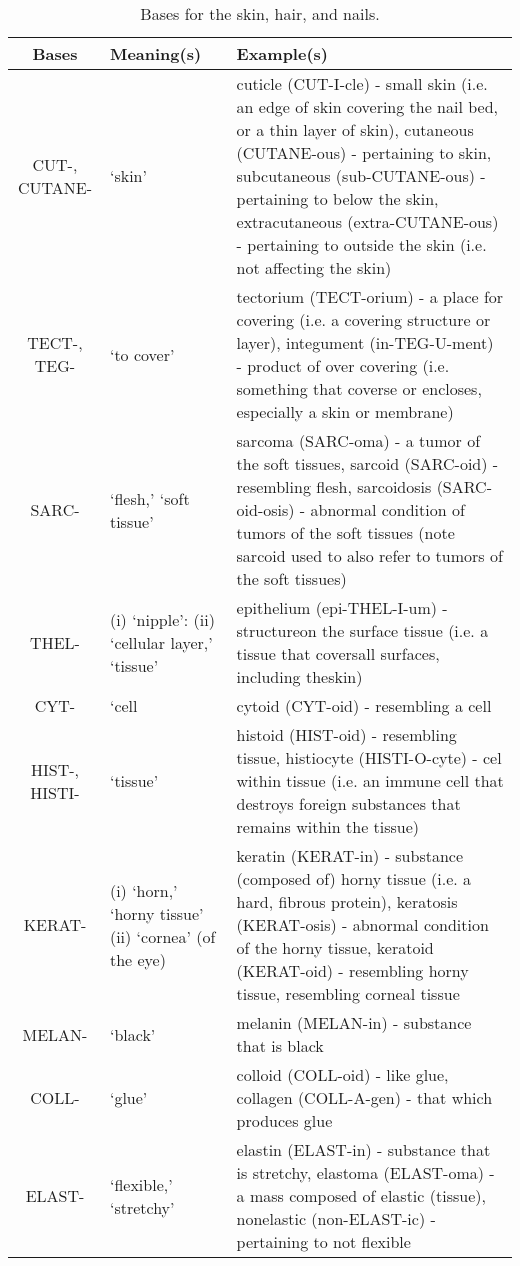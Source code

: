 \begin{longtable}{c | p{} | p{}}
    \caption{Bases for the skin, hair, and nails.}
    \hline
    Bases & Meaning(s) & Example(s) \\ \hline
        CUT-, CUTANE- & `skin' & cuticle (CUT-I-cle) - small skin (i.e. an edge of skin covering the nail bed, or a thin layer of skin), cutaneous (CUTANE-ous) - pertaining to skin, subcutaneous (sub-CUTANE-ous) - pertaining to below the skin, extracutaneous (extra-CUTANE-ous) - pertaining to outside the skin (i.e. not affecting the skin) \\
        TECT-, TEG- & `to cover' & tectorium (TECT-orium) - a place for covering (i.e. a covering structure or layer), integument (in-TEG-U-ment) - product of over covering (i.e. something that coverse or encloses, especially a skin or membrane) \\
        SARC- & `flesh,' `soft tissue' & sarcoma (SARC-oma) - a tumor of the soft tissues, sarcoid (SARC-oid) - resembling flesh, sarcoidosis (SARC-oid-osis) - abnormal condition of tumors of the soft tissues (note sarcoid used to also refer to tumors of the soft tissues) \\
        THEL- & (i) `nipple': (ii) `cellular layer,' `tissue' & epithelium (epi-THEL-I-um) - structureon the surface tissue (i.e. a tissue that coversall surfaces, including theskin) \\
        CYT- & `cell & cytoid (CYT-oid) - resembling a cell \\
        HIST-, HISTI- & `tissue' & histoid (HIST-oid) - resembling tissue, histiocyte (HISTI-O-cyte) - cel within tissue (i.e. an immune cell that destroys foreign substances that remains within the tissue) \\
        KERAT- & (i) `horn,' `horny tissue' (ii) `cornea' (of the eye) & keratin (KERAT-in) - substance (composed of) horny tissue (i.e. a hard, fibrous protein), keratosis (KERAT-osis) - abnormal condition of the horny tissue, keratoid (KERAT-oid) - resembling horny tissue, resembling corneal tissue \\
        MELAN- & `black' & melanin (MELAN-in) - substance that is black \\
        COLL- & `glue' & colloid (COLL-oid) - like glue, collagen (COLL-A-gen) - that which produces glue \\
        ELAST- & `flexible,' `stretchy' & elastin (ELAST-in) - substance that is stretchy, elastoma (ELAST-oma) - a mass composed of elastic (tissue), nonelastic (non-ELAST-ic) - pertaining to not flexible \\

\end{longtable}
